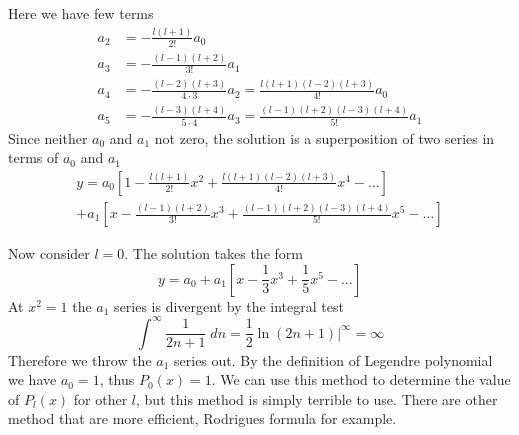 \documentclass[../main.tex]{subfiles}
\begin{document}
Here we have few terms
\begin{align*}
    a_2&=-\frac{l(l+1)}{2!}a_0\\
    a_3&=-\frac{(l-1)(l+2)}{3!}a_1\\
    a_4&=-\frac{(l-2)(l+3)}{4\cdot3}a_2=\frac{l(l+1)(l-2)(l+3)}{4!}a_0\\
    a_5&=-\frac{(l-3)(l+4)}{5\cdot4}a_3=\frac{(l-1)(l+2)(l-3)(l+4)}{5!}a_1
\end{align*}
Since neither $a_0$ and $a_1$ not zero, the solution is a superposition of two series in terms of $a_0$ and $a_1$
\begin{multline*}
    y=a_0\left[1-\frac{l(l+1)}{2!}x^2+\frac{l(l+1)(l-2)(l+3)}{4!}x^4-\dots\right]\\
    +a_1\left[x-\frac{(l-1)(l+2)}{3!}x^3+\frac{(l-1)(l+2)(l-3)(l+4)}{5!}x^5-\dots\right]
\end{multline*}

Now consider $l=0$. The solution takes the form 
\begin{equation*}
    y=a_0+a_1\left[x-\frac{1}{3}x^3+\frac{1}{5}x^5-\dots\right]
\end{equation*}
At $x^2=1$ the $a_1$ series is divergent by the integral test
\begin{equation*}
    \int^\infty \frac{1}{2n+1}\;dn=\frac{1}{2}\ln (2n+1)\bigg|^{\infty}=\infty
\end{equation*}
Therefore we throw the $a_1$ series out. By the definition of Legendre polynomial we have $a_0=1$, thus $P_0(x)=1$. We can use this method to determine the value of $P_l(x)$ for other $l$, but this method is simply terrible to use. There are other method that are more efficient, Rodrigues formula for example.
\end{document}
